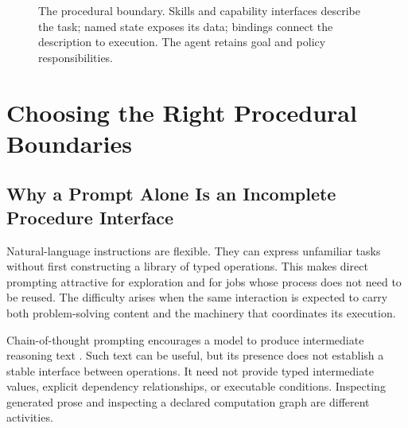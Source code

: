 \documentclass[10pt,twocolumn,a4paper]{article}
\begin{document}
\begin{figure}[t]
\centering
{}
\caption{The procedural boundary. Skills and capability interfaces describe the task; named state exposes its data; bindings connect the description to execution. The agent retains goal and policy responsibilities.}
\label{fig:model}
\end{figure}

\section{Choosing the Right Procedural Boundaries}

\subsection{Why a Prompt Alone Is an Incomplete Procedure Interface}

Natural-language instructions are flexible. They can express unfamiliar tasks without first constructing a library of typed operations. This makes direct prompting attractive for exploration and for jobs whose process does not need to be reused. The difficulty arises when the same interaction is expected to carry both problem-solving content and the machinery that coordinates its execution.


Chain-of-thought prompting encourages a model to produce intermediate reasoning text \cite{r1}. Such text can be useful, but its presence does not establish a stable interface between operations. It need not provide typed intermediate values, explicit dependency relationships, or executable conditions. Inspecting generated prose and inspecting a declared computation graph are different activities.
\end{document}
